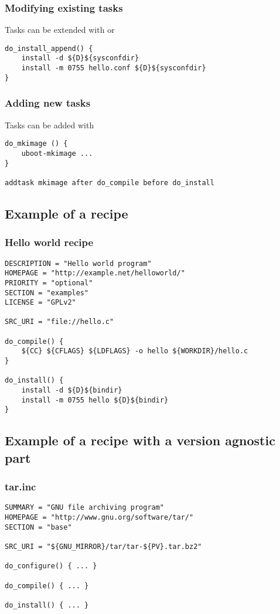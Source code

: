 \begin{frame}[fragile]
  \frametitle{Modifying existing tasks}
  Tasks can be extended with  or 
  \begin{block}{}
    \begin{verbatim}
do_install_append() {
    install -d ${D}${sysconfdir}
    install -m 0755 hello.conf ${D}${sysconfdir}
}
    \end{verbatim}
  \end{block}
\end{frame}

\begin{frame}[fragile]
  \frametitle{Adding new tasks}
  Tasks can be added with 
  \begin{block}{}
    \begin{verbatim}
do_mkimage () {
    uboot-mkimage ...
}

addtask mkimage after do_compile before do_install
    \end{verbatim}
  \end{block}
\end{frame}

\subsection{Example of a recipe}

\begin{frame}[fragile]
  \frametitle{Hello world recipe}
  \begin{block}{}
    \begin{verbatim}
DESCRIPTION = "Hello world program"
HOMEPAGE = "http://example.net/helloworld/"
PRIORITY = "optional"
SECTION = "examples"
LICENSE = "GPLv2"

SRC_URI = "file://hello.c"

do_compile() {
    ${CC} ${CFLAGS} ${LDFLAGS} -o hello ${WORKDIR}/hello.c
}

do_install() {
    install -d ${D}${bindir}
    install -m 0755 hello ${D}${bindir}
}
    \end{verbatim}
  \end{block}
\end{frame}

\subsection{Example of a recipe with a version agnostic part}

\begin{frame}[fragile]
  \frametitle{tar.inc}
  \begin{block}{}
    \begin{verbatim}
SUMMARY = "GNU file archiving program"
HOMEPAGE = "http://www.gnu.org/software/tar/"
SECTION = "base"

SRC_URI = "${GNU_MIRROR}/tar/tar-${PV}.tar.bz2"

do_configure() { ... }

do_compile() { ... }

do_install() { ... }
    \end{verbatim}
  \end{block}
\end{frame}

